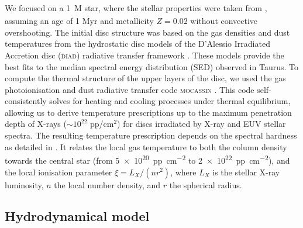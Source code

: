 \documentclass[fleqn,usenatbib]{mnras}
\begin{document}
We focused on a \SI{1}{M_\odot} star, where the stellar properties were taken from \citet{2000A&A...358..593S}, assuming an age of 1 Myr and metallicity $Z=0.02$ without convective overshooting.
The initial disc structure was based on the gas densities and dust temperatures from the hydrostatic disc models of the D'Alessio Irradiated Accretion disc (\textsc{diad}) radiative transfer framework \citep{1998ApJ...500..411D, 1999ApJ...527..893D, 2001ApJ...553..321D, 2005ApJ...621..461D, 2006ApJ...638..314D}. These models provide the best fits to the median spectral energy distribution (SED) observed in Taurus.
To compute the thermal structure of the upper layers of the disc, we used the gas photoionisation and dust radiative transfer code \textsc{mocassin} \citep{2003MNRAS.340.1136E,2005MNRAS.362.1038E,2008ApJS..175..534E}.
This code self-consistently solves for heating and cooling processes under thermal equilibrium, allowing us to derive temperature prescriptions up to the maximum penetration depth of X-rays ($\sim 10^{22}$ pp/cm$^2$) for discs irradiated by X-ray and EUV stellar spectra.
The resulting temperature prescription depends on the spectral hardness as detailed in \citet{2021MNRAS.508.1675E}.
It relates the local gas temperature to both the column density towards the central star (from \SI{5e20}{pp.cm^{-2}} to \SI{2e22}{pp.cm^{-2}}), and the local ionisation parameter \citep{1969ApJ...156..943T} $\xi = L_X/(n r^2)$, where $L_X$ is the stellar X-ray luminosity, $n$ the local number density, and $r$ the spherical radius.

\subsection{Hydrodynamical model}
\end{document}
